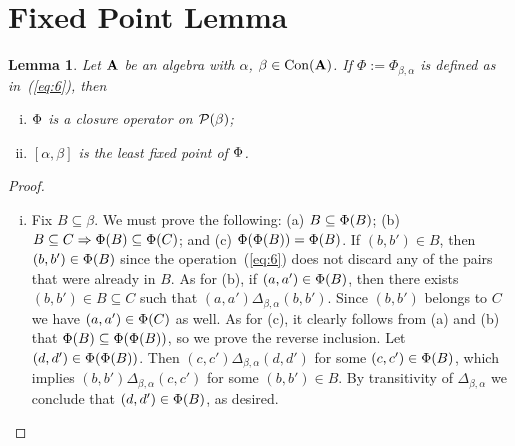 \documentclass[11pt]{amsart}
\numberwithin{equation}{section}
\theoremstyle{plain}
\newtheorem{lemma}[theorem]{Lemma}
\theoremstyle{definition}
\begin{document}
\section{Fixed Point Lemma}
\begin{lemma} Let $\mathbf{A}$ be an algebra with $\alpha$, $\beta\in \operatorname{Con}(\mathbf{A})$.
  If $\Phi:=\Phi_{\beta, \alpha}$ is defined as in~(\ref{eq:6}), then 
  \begin{enumerate}[(i)]
  \item \label{item:1} $\Phi$ is a closure operator on $\mathcal{P}(\beta)$;
  \item $[\alpha, \beta]$ is the least fixed point of $\Phi$.
  \end{enumerate}
\end{lemma}
\begin{proof}\ 
  \begin{enumerate}[(i)]
  \item Fix $B \subseteq \beta$. We must prove the following:
    (a) $B \subseteq \Phi(B)$;    
    (b) $B \subseteq C  \Rightarrow \Phi(B) \subseteq \Phi(C)$;    
    and (c) $\Phi(\Phi(B))  = \Phi(B)$.    
    If $(b,b') \in B$, then $(b,b') \in \Phi(B)$ since the
    operation~(\ref{eq:6}) does not discard any of the pairs that were already in $B$.
    As for (b), if $(a,a') \in \Phi(B)$, then there exists
    $(b,b') \in B \subseteq C$ such that $(a,a') \mathrel{\Delta_{\beta, \alpha}} (b,b')$.
    Since $(b,b')$ belongs to $C$ we have $(a,a') \in \Phi(C)$ as well.
    As for (c), it clearly follows from
    (a) and (b) that $\Phi(B)\subseteq \Phi(\Phi(B))$, so we prove the
    reverse inclusion.    
    Let $(d,d') \in \Phi(\Phi(B))$. Then
    $(c,c') \mathrel{\Delta_{\beta, \alpha}} (d,d')$ for some
    $(c,c') \in \Phi(B)$, which implies
    $(b,b') \mathrel{\Delta_{\beta, \alpha}} (c,c')$ for some
    $(b,b') \in B$.  By transitivity of $\Delta_{\beta, \alpha}$ we conclude that
    $(d,d') \in \Phi(B)$, as desired.
    \bigskip


\end{enumerate}
\end{proof}
\end{document}
